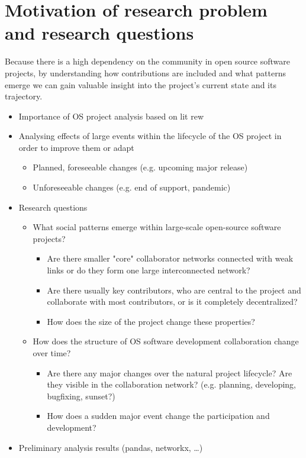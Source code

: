 \section{Motivation of research problem and research questions}
Because there is a high dependency on the community in open source software projects, by understanding how contributions are included and what patterns emerge we can gain valuable insight into the project's current state and its trajectory. \\

\begin{itemize}
    \item Importance of OS project analysis based on lit rew
    \item Analysing effects of large events within the lifecycle of the OS project in order to improve them or adapt
    \begin{itemize}
        \item Planned, foreseeable changes (e.g. upcoming major release)
        \item Unforeseeable changes (e.g. end of support, pandemic)
    \end{itemize}
    \item Research questions
    \begin{itemize}
        \item What social patterns emerge within large-scale open-source software projects?
        \begin{itemize}
            \item Are there smaller "core" collaborator networks connected with weak links or do they form one large interconnected network?
            \item Are there usually key contributors, who are central to the project and collaborate with most contributors, or is it completely decentralized?
            \item How does the size of the project change these properties?
        \end{itemize}
        \item How does the structure of OS software development collaboration change over time?
        \begin{itemize}
            \item Are there any major changes over the natural project lifecycle? Are they visible in the collaboration network? (e.g. planning, developing, bugfixing, sunset?)
            \item How does a sudden major event change the participation and development?
        \end{itemize}
    \end{itemize}
    \item Preliminary analysis results (pandas, networkx, \dots)
\end{itemize}


